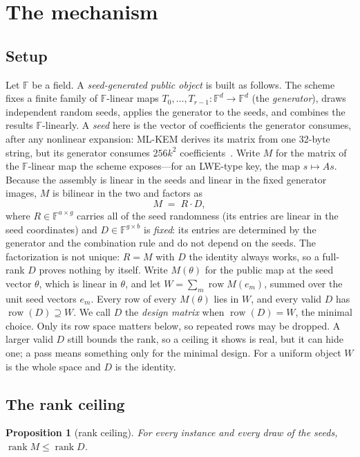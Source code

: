 \documentclass[11pt]{article}
\makeatletter
\newtheorem{proposition}{Proposition}
\theoremstyle{remark}
\newcommand{\F}{\mathbb{F}}
\DeclareMathOperator{\rank}{rank}
\DeclareMathOperator{\row}{row}
\DeclareRobustCommand{\_}{%
  \edef\@tempa{\ttdefault}%
  \ifx\f@family\@tempa\char95 \else\textunderscore\fi\penalty300\relax}
\makeatother
\begin{document}
\section{The mechanism}\label{sec:mech}

\subsection{Setup}\label{sec:setup}

Let $\F$ be a field. A \emph{seed-generated public object} is built as follows. The scheme fixes a finite family of
$\F$-linear maps $T_0,\dots,T_{r-1}\colon\F^d\to\F^d$ (the \emph{generator}), draws independent random seeds, applies
the generator to the seeds, and combines the results $\F$-linearly. A \emph{seed} here is the vector of coefficients the
generator consumes, after any nonlinear expansion: ML-KEM derives its matrix from one 32-byte string, but its generator
consumes $256k^2$ coefficients~\cite{FIPS}. Write $M$ for the matrix of the $\F$-linear map the scheme exposes---for an
LWE-type key, the map $s\mapsto As$. Because the assembly is linear in the seeds and linear in the fixed generator
images, $M$ is bilinear in the two and factors as
\[
  M \;=\; R\cdot D,
\]
where $R\in\F^{a\times g}$ carries all of the seed randomness (its entries are linear in the seed coordinates) and
$D\in\F^{g\times b}$ is \emph{fixed}: its entries are determined by the generator and the combination rule and do not
depend on the seeds. The factorization is not unique: $R=M$ with $D$ the identity always works, so a full-rank $D$
proves nothing by itself. Write $M(\theta)$ for the public map at the seed vector $\theta$, which is linear in $\theta$,
and let $W=\sum_m\row M(e_m)$, summed over the unit seed vectors $e_m$. Every row of every $M(\theta)$ lies in $W$, and
every valid $D$ has $\row(D)\supseteq W$. We call $D$ the \emph{design matrix} when $\row(D)=W$, the minimal choice.
Only its row space matters below, so repeated rows may be dropped. A larger valid $D$ still bounds the rank, so a
ceiling it shows is real, but it can hide one; a pass means something only for the minimal design. For a uniform object
$W$ is the whole space and $D$ is the identity.

\subsection{The rank ceiling}

\begin{proposition}[rank ceiling]\label{prop:ceiling}
For every instance and every draw of the seeds, $\rank M\le\rank D$.
\end{proposition}
\end{document}
